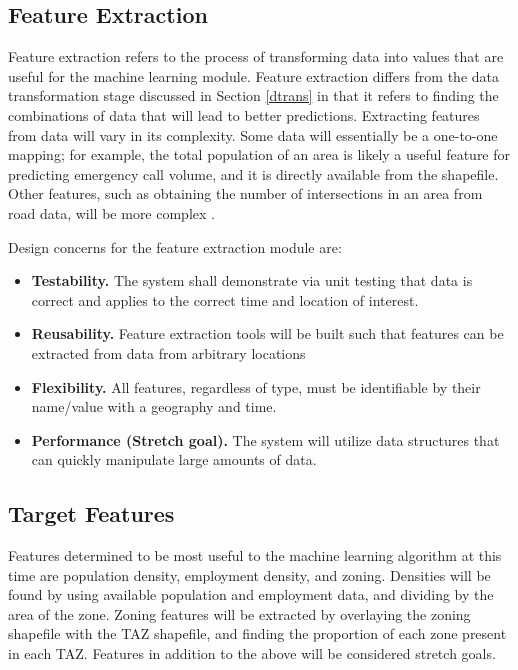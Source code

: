 \documentclass[onecolumn, draftclsnofoot,10pt, compsoc]{IEEEtran}
\begin{document}
\begin{singlespace}
\section{Feature Extraction} \label{feature_extraction}
    Feature extraction refers to the process of transforming data into values that are useful for the machine learning module. 
    Feature extraction differs from the data transformation stage discussed in Section \ref{dtrans} in that it refers to finding the combinations of data that will lead to better predictions.
    Extracting features from data will vary in its complexity.
    Some data will essentially be a one-to-one mapping; for example, the total population of an area is likely a useful feature for predicting emergency call volume, and it is directly available from the shapefile.
    Other features, such as obtaining the number of intersections in an area from road data, will be more complex \cite{SerialMetrics}.
    
    Design concerns for the feature extraction module are:
    \begin{itemize}
        \item \textbf{Testability.} The system shall demonstrate via unit testing that data is correct and applies to the correct time and location of interest.
        \item \textbf{Reusability.} Feature extraction tools will be built such that features can be extracted from data from arbitrary locations 
		\item \textbf{Flexibility.} All features, regardless of type, must be identifiable by their name/value with a geography and time.
		\item \textbf{Performance (Stretch goal).} The system will utilize data structures that can quickly manipulate large amounts of data.
    \end{itemize}

    \subsection{Target Features}
    Features determined to be most useful to the machine learning algorithm at this time are population density, employment density, and zoning. 
    Densities will be found by using available population and employment data, and dividing by the area of the zone. Zoning features will be extracted by overlaying the zoning shapefile with the TAZ shapefile, and finding the proportion of each zone present in each TAZ.
    Features in addition to the above will be considered stretch goals.


\end{singlespace}
\end{document}
